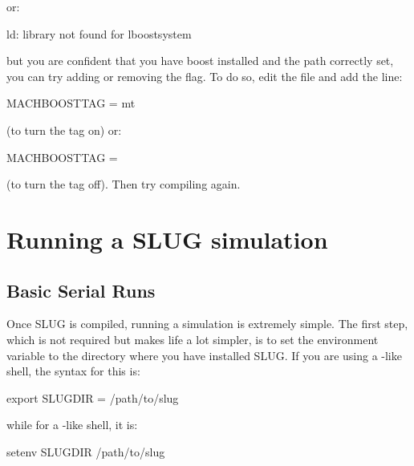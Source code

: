 \documentclass[letterpaper,10pt,english]{sphinxmanual}
\begin{document}
or:

\begin{sphinxVerbatim}[commandchars=\\\{\}]
ld: library not found for \PYGZhy{}lboost\PYGZus{}system
\end{sphinxVerbatim}

but you are confident that you have boost installed and the path
correctly set, you can try adding or removing the  flag. To do
so, edit the file  and add the line:

\begin{sphinxVerbatim}[commandchars=\\\{\}]
MACH\PYGZus{}BOOST\PYGZus{}TAG          = \PYGZhy{}mt
\end{sphinxVerbatim}

(to turn the  tag on) or:

\begin{sphinxVerbatim}[commandchars=\\\{\}]
MACH\PYGZus{}BOOST\PYGZus{}TAG          =
\end{sphinxVerbatim}

(to turn the  tag off). Then try compiling again.


\chapter{Running a SLUG simulation}
\label{\detokenize{running::doc}}\label{\detokenize{running:running-a-slug-simulation}}

\section{Basic Serial Runs}
\label{\detokenize{running:basic-serial-runs}}
Once SLUG is compiled, running a simulation is extremely simple. The first step, which is not required but makes life a lot simpler, is to set the environment variable  to the directory where you have installed SLUG. If you are using a -like shell, the syntax for this is:

\begin{sphinxVerbatim}[commandchars=\\\{\}]
export SLUG\PYGZus{}DIR = /path/to/slug
\end{sphinxVerbatim}

while for a -like shell, it is:

\begin{sphinxVerbatim}[commandchars=\\\{\}]
setenv SLUG\PYGZus{}DIR /path/to/slug
\end{sphinxVerbatim}
\end{document}
